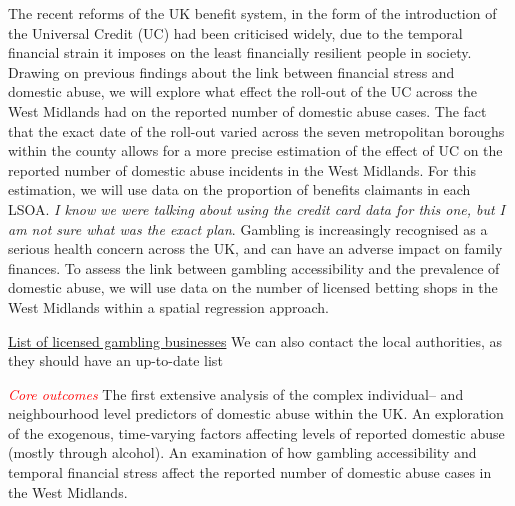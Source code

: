 \documentclass[11pt, a4paper]{article}
\begin{document}
  The recent reforms of the UK benefit system, in the form of the introduction of the Universal Credit (UC) had been criticised widely, due to the temporal financial strain it imposes on the least financially resilient people in society. Drawing on previous findings about the link between financial stress and domestic abuse, we will explore what effect the roll-out of the UC across the West Midlands had on the reported number of domestic abuse cases. The fact that the exact date of the roll-out varied across the seven metropolitan boroughs within the county allows for a more precise estimation of the effect of UC on the reported number of domestic abuse incidents in the West Midlands. For this estimation, we will use data on the proportion of benefits claimants in each LSOA. \textit{I know we were talking about using the credit card data for this one, but I am not sure what was the exact plan}. Gambling is increasingly recognised as a serious health concern across the UK, and can have an adverse impact on family finances. To assess the link between gambling accessibility and the prevalence of domestic abuse, we will use data on the number of licensed betting shops in the West Midlands within a spatial regression approach.

\href{https://secure.gamblingcommission.gov.uk/PublicRegister}{List of licensed gambling businesses} We can also contact the local authorities, as they should have an up-to-date list


\textcolor{red}{\textit{Core outcomes}} The first extensive analysis of the complex individual-- and neighbourhood level predictors of domestic abuse within the UK. An exploration of the exogenous, time-varying factors affecting levels of reported domestic abuse (mostly through alcohol). An examination of how gambling accessibility and temporal financial stress affect the reported number of domestic abuse cases in the West Midlands. 



%
%
%
%
%
%
%
%
%

\end{document}
